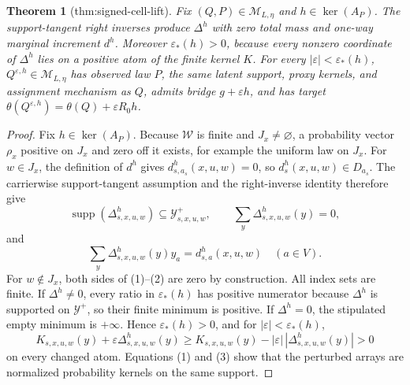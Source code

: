 \documentclass{article}
\newtheorem{theorem}{Theorem}
\begin{document}
\begin{theorem}[thm:signed-cell-lift]\label{thm:signed-cell-lift}
Fix \((Q,P)\in\mathcal M_{L,\eta}\) and \(h\in\ker(A_P)\). The support-tangent right inverses produce \(\Delta^h\) with zero total mass and one-way marginal increment \(d^h\). Moreover \(\varepsilon_*(h)>0\), because every nonzero coordinate of \(\Delta^h\) lies on a positive atom of the finite kernel \(K\). For every \(|\varepsilon|<\varepsilon_*(h)\), \(Q^{\varepsilon,h}\in\mathcal M_{L,\eta}\) has observed law \(P\), the same latent support, proxy kernels, and assignment mechanism as \(Q\), admits bridge \(g+\varepsilon h\), and has target \(\theta(Q^{\varepsilon,h})=\theta(Q)+\varepsilon R_0h\).
\end{theorem}
\begin{proof}
Fix \(h\in\ker(A_P)\).  Because \(\mathcal W\) is finite and \(J_x\ne\varnothing\), a probability vector \(\rho_x\) positive on \(J_x\) and zero off it exists, for example the uniform law on \(J_x\).  For \(w\in J_x\), the definition of \(d^h\) gives \(d^h_{s,a_s}(x,u,w)=0\), so \(d^h_s(x,u,w)\in D_{a_s}\).  The carrierwise support-tangent assumption and the right-inverse identity therefore give
\[
\operatorname{supp}(\Delta^h_{s,x,u,w})\subseteq\mathcal Y^+_{s,x,u,w},\qquad
\sum_y\Delta^h_{s,x,u,w}(y)=0,
\tag{1}
\]
and
\[
\sum_y\Delta^h_{s,x,u,w}(y)y_a=d^h_{s,a}(x,u,w)
\quad(a\in V).
\tag{2}
\]
For \(w\notin J_x\), both sides of (1)--(2) are zero by construction.  All index sets are finite.  If \(\Delta^h\ne0\), every ratio in \(\varepsilon_*(h)\) has positive numerator because \(\Delta^h\) is supported on \(\mathcal Y^+\), so their finite minimum is positive.  If \(\Delta^h=0\), the stipulated empty minimum is \(+\infty\).  Hence \(\varepsilon_*(h)>0\), and for \(|\varepsilon|<\varepsilon_*(h)\),
\[
K_{s,x,u,w}(y)+\varepsilon\Delta^h_{s,x,u,w}(y)
\ge K_{s,x,u,w}(y)-|\varepsilon|\,|\Delta^h_{s,x,u,w}(y)|>0
\tag{3}
\]
on every changed atom.  Equations (1) and (3) show that the perturbed arrays are normalized probability kernels on the same support.


\end{proof}
\end{document}

